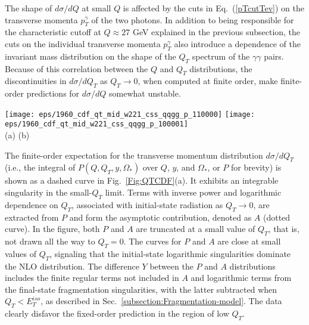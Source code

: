 \documentclass[12pt,english,aps,preprint,prd,letterpaper,fleqn,nofootinbib,showpacs,showkeys,tightenlines,floatfix]{revtex4}
\begin{document}
The shape of $d\sigma/dQ$ at small $Q$ is affected by the cuts in
Eq.~(\ref{pTcutTev}) on the transverse momenta $p_{T}^{\gamma}$
of the two photons. In addition to being responsible for the characteristic
cutoff at $Q\approx27$ GeV explained in the previous subsection,
the cuts on the individual transverse momenta $p_{T}^{\gamma}$ also
introduce a dependence of the invariant mass distribution on the shape
of the $Q_{T}$ spectrum of the $\gamma\gamma$ pairs. Because of
this correlation between the $Q$ and $Q_{T}$ distributions, the
discontinuities in $d\sigma/dQ_{T}$ as $Q_{T}\rightarrow0$, when
computed at finite order, make finite-order predictions for $d\sigma/dQ$
somewhat unstable.

\begin{figure*}
\begin{centering}\texttt{[image: eps/1960\_cdf\_qt\_mid\_w221\_css\_qqgg\_p\_110000]}
\texttt{[image: eps/1960\_cdf\_qt\_mid\_w221\_css\_qqgg\_p\_100001]}\\
 (a) \hspace{0.45\columnwidth} (b) \par\end{centering}


\caption{Transverse momentum distributions in $p\bar{p}\rightarrow\gamma\gamma X$
at $\sqrt{S}=1.96$~TeV along with the CDF data:
(a) the fixed-order prediction $P$ (dashes)
and its asymptotic approximation $A$ (dots);
(b) the full resummed cross section (solid), obtained by matching
the resummed $W+Y$ to the fixed-order prediction $P$ (dashed, same
as in (a)) at large $Q_{T}$. \label{Fig:QTCDF}}
\end{figure*}


The finite-order expectation for the transverse momentum distribution
$d\sigma/dQ_{T}$ (i.e., the integral of  
$P(Q,Q_{T},y,\Omega_{*})$ over $Q$, $y$, and $\Omega_{*}$, or $P$ for brevity)
is shown as a dashed curve in Fig.~\ref{Fig:QTCDF}(a). It exhibits an
integrable singularity in the small-$Q_{T}$ limit. 
Terms with inverse power and logarithmic 
dependence on $Q_{T}$, associated with initial-state radiation
as $Q_{T}\rightarrow0$, are extracted from $P$ and form the asymptotic
contribution, denoted as $A$ (dotted curve). 
In the figure, both $P$ and $A$
are truncated at a small value of $Q_{T}$, that is, not drawn all
the way to $Q_{T}=0$. The curves for $P$ and $A$ are close at small
values of $Q_{T}$, signaling that the initial-state logarithmic singularities
dominate the NLO distribution. The difference $Y$ between the $P$
and $A$ distributions includes the finite regular terms not included
in $A$ and logarithmic terms from the final-state fragmentation singularities,
with the latter subtracted when $Q_{T}<E_{T}^{iso}$, as described
in Sec.~\ref{subsection:Fragmentation-model}. The data clearly disfavor
the fixed-order prediction in the region of low $Q_{T}$.
\end{document}
